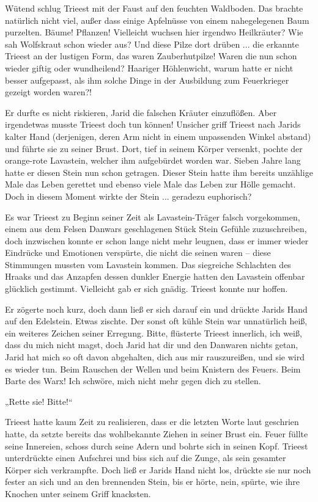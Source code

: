 Wütend schlug Trieest mit der Faust auf den feuchten Waldboden. Das brachte natürlich nicht viel, außer dass einige Apfelnüsse von einem nahegelegenen Baum purzelten. Bäume! Pflanzen! Vielleicht wuchsen hier irgendwo Heilkräuter? Wie sah Wolfskraut schon wieder aus? Und diese Pilze dort drüben ... die erkannte Trieest an der lustigen Form, das waren Zauberhutpilze! Waren die nun schon wieder giftig oder wundheilend? Haariger Höhlenwicht, warum hatte er nicht besser aufgepasst, als ihm solche Dinge in der Ausbildung zum Feuerkrieger gezeigt worden waren?!

Er durfte es nicht riskieren, Jarid die falschen Kräuter einzuflößen. Aber irgendetwas musste Trieest doch tun können! Unsicher griff Trieest nach Jarids kalter Hand (derjenigen, deren Arm nicht in einem unpassenden Winkel abstand) und führte sie zu seiner Brust. Dort, tief in seinem Körper versenkt, pochte der orange-rote Lavastein, welcher ihm aufgebürdet worden war. Sieben Jahre lang hatte er diesen Stein nun schon getragen. Dieser Stein hatte ihm bereits unzählige Male das Leben gerettet und ebenso viele Male das Leben zur Hölle gemacht. Doch in diesem Moment wirkte der Stein ... geradezu euphorisch?

Es war Trieest zu Beginn seiner Zeit als Lavastein-Träger falsch vorgekommen, einem aus dem Felsen Danwars geschlagenen Stück Stein Gefühle zuzuschreiben, doch inzwischen konnte er schon lange nicht mehr leugnen, dass er immer wieder Eindrücke und Emotionen verspürte, die nicht die seinen waren – diese Stimmungen mussten vom Lavastein kommen. Das siegreiche Schlachten des Hraaks und das Anzapfen dessen dunkler Energie hatten den Lavastein offenbar glücklich gestimmt. Vielleicht gab er sich gnädig. Trieest konnte nur hoffen.

Er zögerte noch kurz, doch dann ließ er sich darauf ein und drückte Jarids Hand auf den Edelstein. Etwas zischte. Der sonst oft kühle Stein war unnatürlich heiß, ein weiteres Zeichen seiner Erregung. Bitte, flüsterte Trieest innerlich, ich weiß, dass du mich nicht magst, doch Jarid hat dir und den Danwaren nichts getan, Jarid hat mich so oft davon abgehalten, dich aus mir rauszureißen, und sie wird es wieder tun. Beim Rauschen der Wellen und beim Knistern des Feuers. Beim Barte des Warx! Ich schwöre, mich nicht mehr gegen dich zu stellen.

„Rette sie! Bitte!“

Trieest hatte kaum Zeit zu realisieren, dass er die letzten Worte laut geschrien hatte, da setzte bereits das wohlbekannte Ziehen in seiner Brust ein. Feuer füllte seine Innereien, schoss durch seine Adern und bohrte sich in seinen Kopf. Trieest unterdrückte einen Aufschrei und biss sich auf die Zunge, als sein gesamter Körper sich verkrampfte. Doch ließ er Jarids Hand nicht los, drückte sie nur noch fester an sich und an den brennenden Stein, bis er hörte, nein, spürte, wie ihre Knochen unter seinem Griff knacksten.

